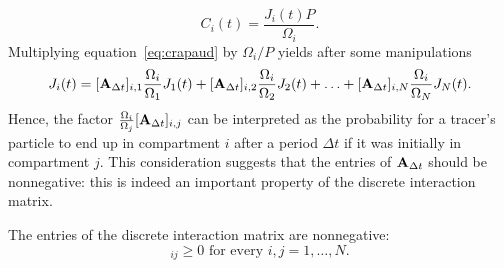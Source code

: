 \begin{equation}
	C_i(t) = \frac{J_i(t) P}{\Omega_i}.
\end{equation}
Multiplying equation~\eqref{eq:crapaud} by $\Omega_i/P$ yields after some manipulations
\begin{equation}
	J_i(t) = [\mathbf A_{\Delta t}]_{i,1} \frac{\Omega_i}{\Omega_1} J_{1}(t) + [\mathbf A_{\Delta t}]_{i,2}\frac{\Omega_i}{\Omega_2} J_{2}(t) + \ldots + [\mathbf A_{\Delta t}]_{i,N}\frac{\Omega_i}{\Omega_N} J_{N}(t).
\end{equation}
Hence, the factor $\frac{\Omega_i}{\Omega_j}[\mathbf A_{\Delta t}]_{i,j}$ can be interpreted as the probability \label{page:probability_interpretation} for a tracer's particle to end up in compartment $i$ after a period $\Delta t$ if it was initially in compartment $j$. This consideration suggests that the entries of $\mathbf A_{\Delta t}$ should be nonnegative: this is indeed an important property of the discrete interaction matrix.
\begin{property} \label{prop1_discr_comp}
	The entries of the discrete interaction matrix are nonnegative:
	\begin{equation}
		[\b A_{\Delta t}]_{ij} \ge 0 \mbox{ for every } i,j = 1,\dots,N.
	\end{equation}
\end{property}
